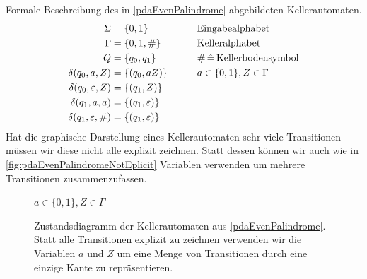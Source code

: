 \begin{Bsp}\label{bsp:pda-wwr}
  Formale Beschreibung des in \autoref{pdaEvenPalindrome} abgebildeten
  Kellerautomaten. 
        \begin{align}
                \Sigma &= \{0,1\} &\qquad&\text{Eingabealphabet} \notag\\
                \Gamma &= \{0,1,\#\} &&\text{Kelleralphabet} \notag\\
                Q &= \{q_0,q_1\} &&\#\,\hat=\,\text{Kellerbodensymbol} \notag\\
                \delta(q_0,a,Z) &= \{(q_0,aZ) \}&& a\in\{0,1\},Z\in\Gamma\\
                \delta(q_0,\varepsilon,Z) &= \{(q_1,Z)\} \label{eq:5.2}\\
                \delta(q_1,a,a) &= \{(q_1,\varepsilon)\}\\
                \delta(q_1,\varepsilon,\#) &= \{(q_1,\varepsilon)\}
        \end{align}
Hat die graphische Darstellung eines Kellerautomaten sehr viele Transitionen müssen wir diese nicht alle explizit zeichnen.
Statt dessen können wir auch wie in \autoref{fig:pdaEvenPalindromeNotEplicit}
Variablen verwenden um mehrere Transitionen zusammenzufassen.
        
\begin{figure}[tp]\centering
   \begin{center}
  $a\in\{0,1\}, Z\in\Gamma$
\end{center}
	\caption{Zustandsdiagramm der Kellerautomaten aus \autoref{pdaEvenPalindrome}. 
	Statt alle Transitionen explizit zu zeichnen verwenden wir die Variablen $a$ und $Z$ um eine Menge von Transitionen durch eine einzige Kante zu repräsentieren. }
	\label{fig:pdaEvenPalindromeNotEplicit}
\end{figure}
\end{Bsp}


